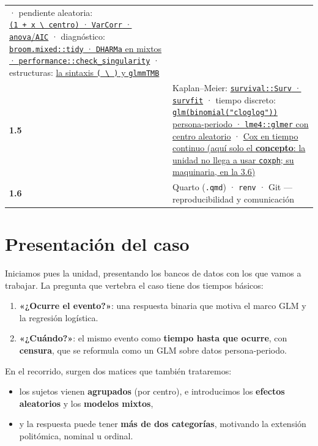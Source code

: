\documentclass[
  letterpaper,
  DIV=11,
  numbers=noendperiod]{scrartcl}
\providecommand{\tightlist}{%
  \setlength{\itemsep}{0pt}\setlength{\parskip}{0pt}}\usepackage{longtable,booktabs,array}
\begin{document}
\begin{tcolorbox}
\begin{longtable}[]{@{}
  >{\centering\arraybackslash}p{}
  >{\raggedright\arraybackslash}p{}@{}}
{\texttt{performance::icc} · \texttt{ranef}} · pendiente aleatoria:
\protect\hyperlink{sec-u14-pendiente}{\texttt{(1\ +\ x\ \textbackslash{}\textbar{}\ centro)}
· \texttt{VarCorr} · \texttt{anova}/\texttt{AIC}} · diagnóstico:
\protect\hyperlink{sec-u14-diagnostico}{\texttt{broom.mixed::tidy} ·
\texttt{DHARMa} en mixtos · \texttt{performance::check\_singularity}} ·
estructuras: \protect\hyperlink{sec-u14-extensiones}{la sintaxis
\texttt{(\ \textbackslash{}\textbar{}\ )} y \texttt{glmmTMB}} \\
\textbf{1.5} & Kaplan--Meier:
\protect\hyperlink{sec-u15-prop}{\texttt{survival::Surv} ·
\texttt{survfit}} · tiempo discreto:
\protect\hyperlink{sec-u15-lab}{\texttt{glm(binomial("cloglog"))}
persona-periodo · \texttt{lme4::glmer} con centro aleatorio} ·
\protect\hyperlink{sec-u15-cox}{Cox en tiempo continuo (aquí solo el
\textbf{concepto}: la unidad no llega a usar \texttt{coxph}; su
maquinaria, en la 3.6)} \\
\textbf{1.6} & Quarto (\texttt{.qmd}) · \texttt{renv} · Git ---
reproducibilidad y comunicación \\
\bottomrule()
\end{longtable}

\end{tcolorbox}

\hypertarget{sec-presentacion}{%
\section{Presentación del caso}\label{sec-presentacion}}

Iniciamos pues la unidad, presentando los bancos de datos con los que
vamos a trabajar. La pregunta que vertebra el caso tiene dos tiempos
básicos:

\begin{enumerate}
\def\labelenumi{\arabic{enumi}.}
\tightlist
\item
  \textbf{«¿Ocurre el evento?»}: una respuesta binaria que motiva el
  marco GLM y la regresión logística.
\item
  \textbf{«¿Cuándo?»}: el mismo evento como \textbf{tiempo hasta que
  ocurre}, con \textbf{censura}, que se reformula como un GLM sobre
  datos persona-periodo.
\end{enumerate}

En el recorrido, surgen dos matices que también trataremos:

\begin{itemize}
\tightlist
\item
  los sujetos vienen \textbf{agrupados} (por centro), e introducimos los
  \textbf{efectos aleatorios} y los \textbf{modelos mixtos},
\item
  y la respuesta puede tener \textbf{más de dos categorías}, motivando
  la extensión politómica, nominal u ordinal.
\end{itemize}
\end{document}
